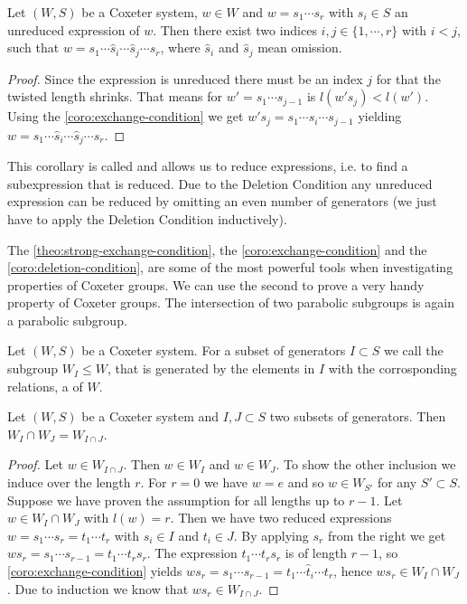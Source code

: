 \begin{coro}
	Let $(W,S)$ be a Coxeter system, $w \in W$ and $w = s_1 \cdots s_r$ with $s_i \in S$ an unreduced expression of $w$. Then there exist two indices $i,j \in \{1,\cdots,r\}$ with $i < j$, such that $w = s_1 \cdots \hat s_i \cdots \hat s_j \cdots s_r$, where $\hat s_i$ and $\hat s_j$ mean omission.

	\begin{proof}
		Since the expression is unreduced there must be an index $j$ for that the twisted length shrinks. That means for $w' = s_1 \cdots s_{j-1}$ is $l(w' s_j) < l(w')$. Using the \ref{coro:exchange-condition} we get $w' s_j = s_1 \cdots \hat s_i \cdots s_{j-1}$ yielding $w = s_1 \cdots \hat s_i \cdots \hat s_j \cdots s_r$.
	\end{proof}
\end{coro}

This corollary is called  and allows us to reduce expressions, i.e. to find a subexpression that is reduced. Due to the Deletion Condition any unreduced expression can be reduced by omitting an even number of generators (we just have to apply the Deletion Condition inductively).

The \ref{theo:strong-exchange-condition}, the \ref{coro:exchange-condition} and the \ref{coro:deletion-condition}, are some of the most powerful tools when investigating properties of Coxeter groups. We can use the second to prove a very handy property of Coxeter groups. The intersection of two parabolic subgroups is again a parabolic subgroup.

\begin{defi}
	Let $(W,S)$ be a Coxeter system. For a subset of generators $I \subset S$ we call the subgroup $W_I \leq W$, that is generated by the elements in $I$ with the corrosponding relations, a  of $W$.
\end{defi}

\begin{lemm}
	Let $(W,S)$ be a Coxeter system and $I,J \subset S$ two subsets of generators. Then ${W_I \cap W_J} = W_{I \cap J}$.

	\begin{proof}
		Let $w \in W_{I \cap J}$. Then $w \in W_I$ and $w \in W_J$. To show the other inclusion we induce over the length $r$. For $r = 0$ we have $w = e$ and so $w \in W_{S'}$ for any $S' \subset S$. Suppose we have proven the assumption for all lengths up to $r-1$. Let $w \in W_I \cap W_J$ with $l(w) = r$. Then we have two reduced expressions $w = s_1 \cdots s_r = t_1 \cdots t_r$ with $s_i \in I$ and $t_i \in J$. By applying $s_r$ from the right we get $w s_r = s_1 \cdots s_{r-1} = t_1 \cdots t_r s_r$. The expression $t_1 \cdots t_r s_r$ is of length $r-1$, so \ref{coro:exchange-condition} yields $w s_r = s_1 \cdots s_{r-1} = t_1 \cdots \hat t_i \cdots t_r$, hence $w s_r \in W_I \cap W_J$. Due to induction we know that $w s_r \in W_{I \cap J}$. \todo
	\end{proof}
\end{lemm}